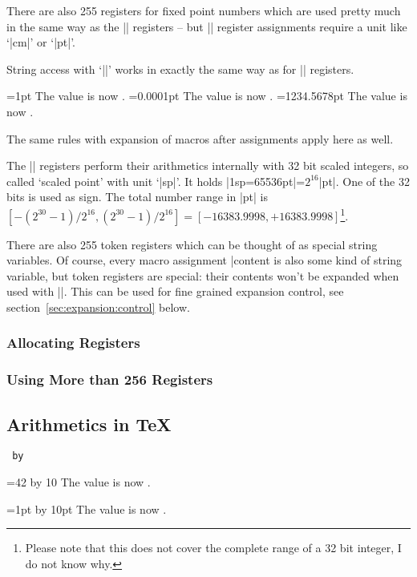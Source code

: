 \begin{command}{\dimen{}}
	There are also 255 registers for fixed point numbers which are used pretty much in the same way as the |\count| registers -- but |\dimen| register assignments require a unit like `|cm|' or `|pt|'.

	String access with `|\the|' works in exactly the same way as for |\count| registers.
\begin{codeexample}[]
=1pt
The value is now \the{}.
=0.0001pt
The value is now \the{}.
\def\macro{1234.5678}
=\macro pt
The value is now \the{}.
\end{codeexample}
	The same rules with expansion of macros after assignments apply here as well.

	The |\dimen| registers perform their arithmetics internally with 32 bit scaled integers, so called `scaled point' with unit `|sp|'. It holds |1sp=65536pt|=$2^{16}$|pt|. One of the 32 bits is used as sign. The total number range in |pt| is $[-(2^{30}-1)/2^{16}, (2^{30}-1)/2^{16} ] = [-16383.9998,+16383.9998]$\footnote{Please note that this does not cover the complete range of a 32 bit integer, I do not know why.}.
\end{command}

\begin{command}{\toks{}}
\label{cmd:toks}
	There are also 255 token registers which can be thought of as special string variables. Of course, every macro assignment |\def\macro|\marg{content} is also some kind of string variable, but token registers are special: their contents won't be expanded when used with |\the\toks|. This can be used for fine grained expansion control, see section~\ref{sec:expansion:control} below.
\end{command}

\subsubsection{Allocating Registers}

\subsubsection{Using More than 256 Registers}

\subsection{Arithmetics in \TeX}
\begin{command}{\advance{}\texttt{ by}}
\begin{codeexample}[]
=42
\advance{} by 10
The value is now \the{}.
\end{codeexample}

\begin{codeexample}[]
=1pt
\advance{} by 10pt
The value is now \the{}.
\end{codeexample}
\end{command}

